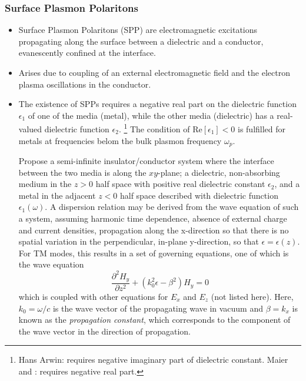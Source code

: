 \subsubsection{Surface Plasmon Polaritons}
\begin{itemize}
    \item Surface Plasmon Polaritons (SPP) are electromagnetic excitations propagating along the surface between a dielectric and a conductor, evanescently confined at the interface.
    
    \item Arises due to coupling of an external electromagnetic field and the electron plasma oscillations in the conductor.
    
    \item The existence of SPPs requires a negative real part on the dielectric function $\epsilon_1$ of one of the media (metal), while the other media (dielectric) has a real-valued dielectric function $\epsilon_2$. \footnote{Hans Arwin\cite{hans_arwin}: requires negative imaginary part of dielectric constant. Maier\cite{maier} and \cite{Stockman:11}: requires negative real part.} The condition of Re$[\epsilon_1]<0$ is fulfilled for metals at frequencies belom the bulk plasmon frequency $\omega_p$.
    
    Propose a semi-infinite insulator/conductor system where the interface between the two media is along the $xy$-plane; a dielectric, non-absorbing medium in the $z>0$ half space with positive real dielectric constant $\epsilon_2$, and a metal in the adjacent $z<0$ half space described with dielectric function $\epsilon_1(\omega)$. A dispersion relation may be derived from the wave equation of such a system, assuming harmonic time dependence, absence of external charge and current densities, propagation along the x-direction so that there is no spatial variation in the perpendicular, in-plane y-direction, so that $\epsilon = \epsilon(z)$. For TM modes, this results in a set of governing equations, one of which is the wave equation
    \begin{equation}
        \label{eq:maier wave eq TM}
        \frac{\partial^2H_y}{\partial z^2} + (k_0^2\epsilon - \beta ^2)H_y = 0
    \end{equation}
    which is coupled with other equations for $E_x$ and $E_z$ (not listed here). Here, $k_0 = \omega/c$ is the wave vector of the propagating wave in vacuum and $\beta = k_x$ is known as the \emph{propagation constant}, which corresponds to the component of the wave vector in the direction of propagation.
    

\end{itemize}
